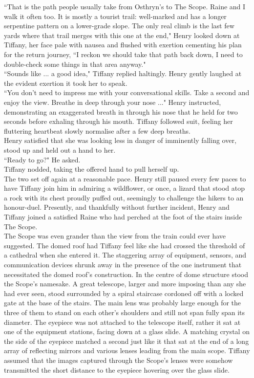 ``That is the path people usually take from Osthryn's to The Scope. Raine and I walk it often too. It is mostly a tourist trail: well-marked and has a longer serpentine pattern on a lower-grade slope. The only real climb is the last few yards where that trail merges with this one at the end," Henry looked down at Tiffany, her face pale with nausea and flushed with exertion cementing his plan for the return journey, ``I reckon we should take that path back down, I need to double-check some things in that area anyway."\\

``Sounds like ... a good idea," Tiffany replied haltingly. 
Henry gently laughed at the evident exertion it took her to speak.\\
``You don't need to impress me with your conversational skills. Take a second and enjoy the view. Breathe in deep through your nose ..." Henry instructed, demonstrating an exaggerated breath in through his nose that he held for two seconds before exhaling through his mouth.
Tiffany followed suit, feeling her fluttering heartbeat slowly normalise after a few deep breaths.\\
Henry satisfied that she was looking less in danger of imminently falling over, stood up and held out a hand to her.\\
``Ready to go?" He asked.\\
Tiffany nodded, taking the offered hand to pull herself up.\\

The two set off again at a reasonable pace. 
Henry still paused every few paces to have Tiffany join him in admiring a wildflower, or once, a lizard that stood atop a rock with its chest proudly puffed out, seemingly to challenge the hikers to an honour-duel.
Presently, and thankfully without further incident, Henry and Tiffany joined a satisfied Raine who had perched at the foot of the stairs inside The Scope.\\

The Scope was even grander than the view from the train could ever have suggested.
The domed roof had Tiffany feel like she had crossed the threshold of a cathedral when she entered it.
The staggering array of equipment, sensors, and communication devices shrunk away in the presence of the one instrument that necessitated the domed roof's construction.
In the centre of dome structure stood the Scope's namesake.
A great telescope, larger and more imposing than any she had ever seen, stood surrounded by a spiral staircase cordoned off with a locked gate at the base of the stairs.
The main lens was probably large enough for the three of them to stand on each other's shoulders and still not span fully span its diameter.
The eyepiece was not attached to the telescope itself, rather it sat at one of the equipment stations, facing down at a glass slide.
A matching crystal on the side of the eyepiece matched a second just like it that sat at the end of a long array of reflecting mirrors and various lenses leading from the main scope.
Tiffany assumed that the images captured through the Scope's lenses were somehow transmitted the short distance to the eyepiece hovering over the glass slide.\\

